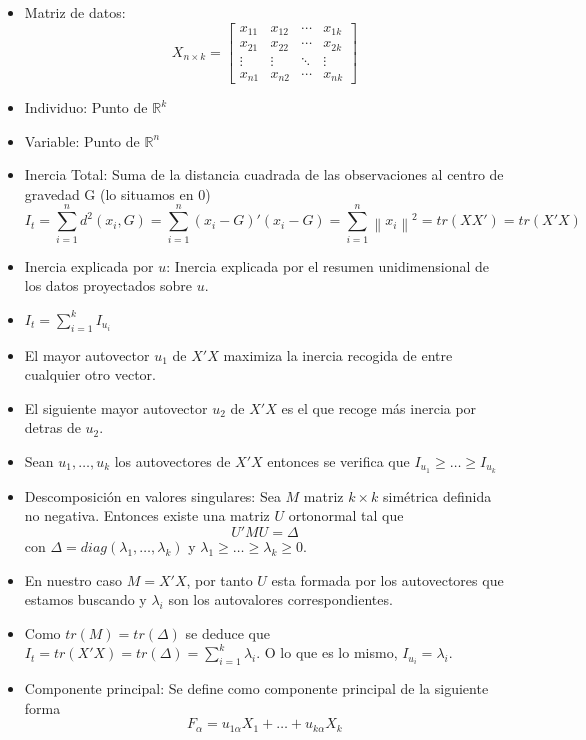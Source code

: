 \documentclass{article}
\begin{document}
\begin{itemize}
    \item Matriz de datos:
          \[X_{n \times k} = \begin{bmatrix}x_{11} & x_{12} & \cdots & x_{1k} \\ x_{21} & x_{22} & \cdots & x_{2k} \\ \vdots & \vdots & \ddots & \vdots \\ x_{n1} & x_{n2} & \cdots & x_{nk}\end{bmatrix}\]
    \item Individuo: Punto de $\mathbb{R}^k$
    \item Variable: Punto de $\mathbb{R}^n$
    \item Inercia Total: Suma de la distancia cuadrada de las observaciones al centro de gravedad G (lo situamos en 0)
          \[I_t = \sum_{i=1}^{n}d^2(x_i, G) = \sum_{i=1}^{n}(x_i-G)'(x_i-G) = \sum_{i=1}^{n}\left\lVert x_i \right\rVert^2 = tr(XX') = tr(X'X)\]
    \item Inercia explicada por $u$: Inercia explicada por el resumen unidimensional de los datos proyectados sobre $u$.
    \item $I_t = \sum_{i=1}^{k}I_{u_i}$
    \item El mayor autovector $u_1$ de $X'X$ maximiza la inercia recogida de entre cualquier otro vector.
    \item El siguiente mayor autovector $u_2$ de $X'X$ es el que recoge más inercia por detras de $u_2$.
    \item Sean $u_1, \dots, u_k$ los autovectores de $X'X$ entonces se verifica que $I_{u_1} \geq \dots \geq I_{u_k}$
    \item Descomposición en valores singulares: Sea $M$ matriz $k\times k$ simétrica definida no negativa. Entonces existe una matriz $U$ ortonormal tal que
          \[U'MU = \Delta\]
          con $\Delta = diag(\lambda_1, \dots, \lambda_k)$ y $\lambda_1 \geq \dots \geq \lambda_k \geq 0$.
    \item En nuestro caso $M = X'X$, por tanto $U$ esta formada por los autovectores que estamos buscando y $\lambda_i$ son los autovalores correspondientes.
    \item Como $tr(M) = tr(\Delta)$ se deduce que $I_t = tr(X'X) = tr(\Delta) = \sum_{i=1}^{k}\lambda_i$. O lo que es lo mismo, $I_{u_i} = \lambda_i$.
    \item Componente principal: Se define como componente principal de la siguiente forma \[F_\alpha = u_{1\alpha}X_1 + \dots + u_{k\alpha}X_k\]
          \newpage

\end{itemize}
\end{document}
